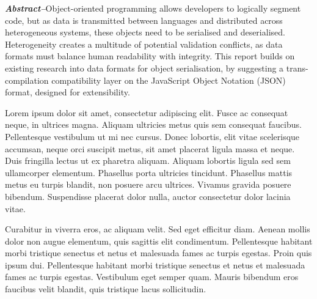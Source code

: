 \documentclass[../report.tex]{subfiles}
\begin{document}
{\textbf{\textit{Abstract--}}Object-oriented programming allows developers to logically segment code, but as data is transmitted between languages and distributed across heterogeneous systems, these objects need to be serialised and deserialised. Heterogeneity creates a multitude of potential validation conflicts, as data formats must balance human readability with integrity. This report builds on existing research into data formats for object serialisation, by suggesting a trans-compilation compatibility layer on the JavaScript Object Notation (JSON) format, designed for extensibility.}

\color{red}
Lorem ipsum dolor sit amet, consectetur adipiscing elit. Fusce ac consequat neque, in ultrices magna. Aliquam ultricies metus quis sem consequat faucibus. Pellentesque vestibulum ut mi nec cursus. Donec lobortis, elit vitae scelerisque accumsan, neque orci suscipit metus, sit amet placerat ligula massa et neque. Duis fringilla lectus ut ex pharetra aliquam. Aliquam lobortis ligula sed sem ullamcorper elementum. Phasellus porta ultricies tincidunt. Phasellus mattis metus eu turpis blandit, non posuere arcu ultrices. Vivamus gravida posuere bibendum. Suspendisse placerat dolor nulla, auctor consectetur dolor lacinia vitae.

Curabitur in viverra eros, ac aliquam velit. Sed eget efficitur diam. Aenean mollis dolor non augue elementum, quis sagittis elit condimentum. Pellentesque habitant morbi tristique senectus et netus et malesuada fames ac turpis egestas. Proin quis ipsum dui. Pellentesque habitant morbi tristique senectus et netus et malesuada fames ac turpis egestas. Vestibulum eget semper quam. Mauris bibendum eros faucibus velit blandit, quis tristique lacus sollicitudin. \\
\color{black}
\end{document}
